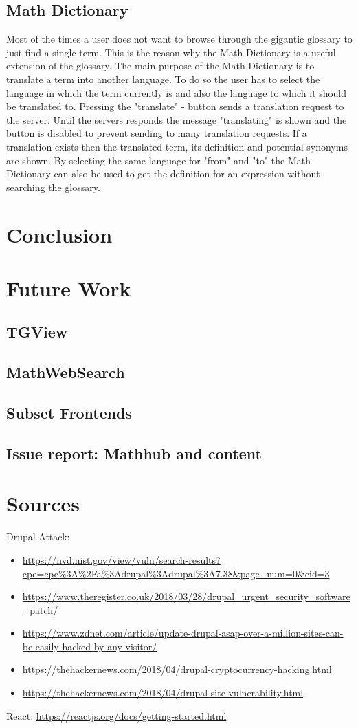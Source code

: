 \documentclass[11pt,a4paper]{article}
\begin{document}
 	\subsection{Math Dictionary}
Most of the times a user does not want to browse through the gigantic glossary to just find a single term. This is the reason why the Math Dictionary is a useful extension of the glossary.
The main purpose of the Math Dictionary is to translate a term into another language. To do so the user has to select the language in which the term currently is and also the language to which it should be translated to. Pressing the "translate" - button sends a translation request to the server. Until the servers responds the message "translating" is shown and the button is disabled to prevent sending to many translation requests. If a translation exists then the translated term, its definition and potential synonyms are shown.
By selecting the same language for "from" and "to" the Math Dictionary can also be used to get the definition for an expression without searching the glossary.

\section{Conclusion}

\section{Future Work}
	\subsection{TGView}
	\subsection{MathWebSearch}
	\subsection{Subset Frontends}
	\subsection{Issue report: Mathhub and content}

\section{Sources}
Drupal Attack:
\begin{itemize}
\item \url{https://nvd.nist.gov/view/vuln/search-results?cpe=cpe%3A%2Fa%3Adrupal%3Adrupal%3A7.38&page_num=0&cid=3}
\item \url{https://www.theregister.co.uk/2018/03/28/drupal_urgent_security_software_patch/}
\item \url{https://www.zdnet.com/article/update-drupal-asap-over-a-million-sites-can-be-easily-hacked-by-any-visitor/}
\item \url{https://thehackernews.com/2018/04/drupal-cryptocurrency-hacking.html}
\item \url{https://thehackernews.com/2018/04/drupal-site-vulnerability.html}
\end{itemize}

React: 
\url{https://reactjs.org/docs/getting-started.html}
\end{document}
